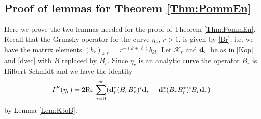 \documentclass{article}
\numberwithin{equation}{section}
\numberwithin{figure}{section}
\theoremstyle{plain}
\theoremstyle{plain}
\numberwithin{thm}{section}
\theoremstyle{remark}
\newcommand{\re}{\text{{\rm Re}\,}}
\begin{document}
\subsection{Proof of lemmas for Theorem \ref{Thm:PommEn}}\label{Subsec:ProofPommEn}


Here we prove the two lemmas needed for the proof of Theorem \ref{Thm:PommEn}.
Recall that the Grunsky operator for the curve $\eta_r$, $r>1$, is given by \eqref{Br}, i.e. we have the matrix elements $(b_r)_{k\ell}=r^{-(k+\ell)}b_{kl}$. Let $\mathcal{K}_r$ and ${\bf d}_r$ be as in \eqref{Kop} and \eqref{dvec} with $B$ replaced by $B_r$. Since $\eta_r$ is an analytic curve the operator $B_r$ is Hilbert-Schmidt and we have the identity
\begin{equation}\label{EPfor}
  I^F(\eta_r)=2\re\sum_{i=0}^\infty({\bf d}_r^*(B_rB_r^*)^i{\bf d}_r-{\bf d}_r^*(B_rB_r^*)^i B_r\bar{{\bf d}}_r )
\end{equation}
by Lemma \ref{Lem:KtoB}. 
\end{document}
